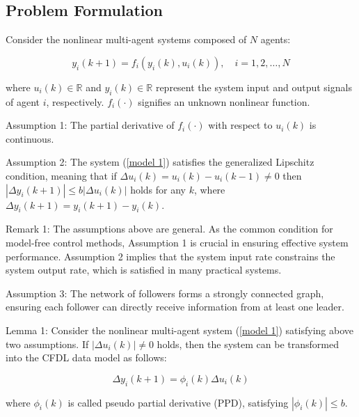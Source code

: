 \documentclass[journal,onecolumn]{IEEEtran}
\begin{document}
\subsection{Problem Formulation}

Consider the nonlinear multi-agent systems composed of $ N $ agents:

\begin{equation}
    \label{model 1}
    y_i(k+1) = f_i(y_i(k), u_i(k)), \quad i = 1, 2, \dots, N
\end{equation}

where $u_i(k) \in \mathbb{R}$ and $y_i(k) \in \mathbb{R}$ represent the system input and output signals of agent $ i $, respectively. $f_i(\cdot)$ signifies an unknown nonlinear function.

Assumption 1: The partial derivative of \( f_i(\cdot) \) with respect to \( u_i(k) \) is continuous.

Assumption 2: The system (\ref{model 1}) satisfies the generalized Lipschitz condition, meaning that if \( \Delta u_i(k) = u_i(k) - u_i(k - 1) \neq 0 \) then \( | \Delta y_i(k + 1) | \leq b |\Delta u_i(k)| \) holds for any \( k \), where \( \Delta y_i(k + 1) = y_i(k + 1) - y_i(k) \).
 


Remark 1: The assumptions above are general. As the common condition for model-free control methods, Assumption 1 is crucial in ensuring effective system performance. Assumption 2 implies that the system input rate constrains the system output rate, which is satisfied in many practical systems.

Assumption 3: The network of followers forms a strongly connected graph, ensuring each follower can directly receive information from at least one leader.

Lemma 1\cite{8}: Consider the nonlinear multi-agent system (\ref{model 1}) satisfying above two assumptions. If $ | \Delta u_i(k) | \neq 0 $ holds, then the system can be transformed into the CFDL data model as follows:


\begin{equation}
    \label{model 2}
    \Delta y_i(k+1)=\phi_i(k)\Delta u_i(k)
\end{equation}

where \(\phi_i(k)\) is called pseudo partial derivative (PPD), satisfying \( | \phi_i(k) | \leq b\).
 
\end{document}
